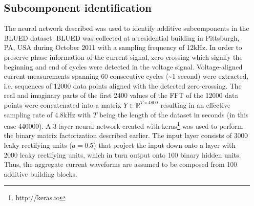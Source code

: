 \subsection{Subcomponent identification}
The neural network described was used to identify additive subcomponents in the BLUED \cite{anderson2012blued} dataset. BLUED was collected at a residential building in Pittsburgh, PA, USA during October 2011 with a sampling frequency of 12kHz. In order to preserve phase information of the current signal, zero-crossing which signify the beginning and end of cycles were detected in the voltage signal. Voltage-aligned current measurements spanning 60 consecutive cycles (\~{}1 second) were extracted, i.e. sequences of 12000 data points aligned with the detected zero-crossing. The real and imaginary parts of the first 2400 values of the FFT of the 12000 data points were concatenated into a matrix $Y \in \mathbb{R}^{T \times 4800}$ resulting in an effective sampling rate of 4.8kHz with $T$ being the length of the dataset in seconds (in this case 440000). A 3-layer neural network created with keras\footnote{http://keras.io} was used to perform the binary matrix factorization described earlier. The input layer consists of 3000 leaky rectifying units ($a = 0.5$) that project the input down onto a layer with 2000 leaky rectifying units, which in turn output onto 100 binary hidden units. Thus, the aggregate current waveforms are assumed to be composed from 100 additive building blocks.\\
